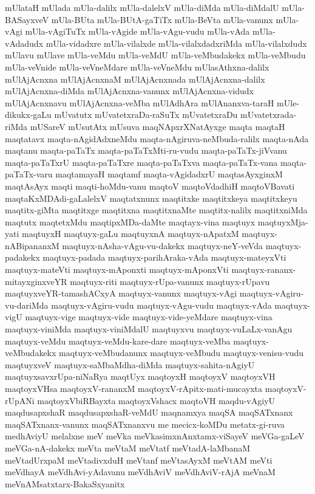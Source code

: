 {mUlataH
mUlada
mUla-dalilx
mUla-dalelxV
mUla-diMda
mUla-diMdalU
mUla-BASayxveV
mUla-BUta
mUla-BUtA-gaTiTx
mUla-BeVta
mUla-vanunx
mUla-vAgi
mUla-vAgiTuTx
mUla-vAgide
mUla-vAgu-vudu
mUla-vAda
mUla-vAdadudx
mUla-vidadxre
mUla-vilalxde
mUla-vilalxdadxriMda
mUla-vilalxdudx
mUlavu
mUlave
mUla-veMdu
mUla-veMdU
mUla-veMbudakekx
mUla-veMbudu
mUla-veVnide
mUla-veVneMdare
mUla-veVneMdu
mUlasAthxna-dalilx
mUlAjAcnxna
mUlAjAcnxnaM
mUlAjAcnxnada
mUlAjAcnxna-dalilx
mUlAjAcnxna-diMda
mUlAjAcnxna-vanunx
mUlAjAcnxna-vidudx
mUlAjAcnxnavu
mUlAjAcnxna-veMba
mUlAdhAra
mUlAnanxva-taraH
mUle-dikukx-gaLu
mUvatutx
mUvatetxraDa-raSuTx
mUvatetxraDu
mUvatetxrada-riMda
mUSareV
mUsutAtx
mUsuva
maqNApxrXNatAyxge
maqta
maqtaH
maqtatavx
maqta-nAgidAdxneMdu
maqta-nAgiruva-neMbuda-ralilx
maqta-nAda
maqtanu
maqta-paTaTx
maqta-paTaTxMti-ru-vudu
maqta-paTaTx-jiVvanu
maqta-paTaTxrU
maqta-paTaTxre
maqta-paTaTxva
maqta-paTaTx-vana
maqta-paTaTx-varu
maqtamayaH
maqtamf
maqta-vAgidadxrU
maqtasAyxginxM
maqtAsAyx
maqti
maqti-hoMdu-vanu
maqtoV
maqtoVdadhiH
maqtoVBavati
maqtaKxMDAdi-gaLalelxV
maqtatxnunx
maqtitxke
maqtitxkeya
maqtitxkeyu
maqtitx-giMta
maqtitxge
maqtitxna
maqtitxnaMte
maqtitx-nalilx
maqtitxniMda
maqtutx
maqtetxMdu
maqtipxMDa-daMte
maqtayx-vina
maqtuyx
maqtuyxMja-yati
maqtuyxH
maqtuyx-gaLu
maqtuyxnA
maqtuyx-nApatxM
maqtuyx-nABipananxM
maqtuyx-nAsha-vAgu-vu-dakekx
maqtuyx-neY-veVda
maqtuyx-padakekx
maqtuyx-padada
maqtuyx-parihAraka-vAda
maqtuyx-mateyxVti
maqtuyx-mateVti
maqtuyx-mAponxti
maqtuyx-mAponxVti
maqtuyx-rananx-mitayxginxveYR
maqtuyx-riti
maqtuyx-rUpa-vanunx
maqtuyx-rUpavu
maqtuyxveYR-tamashACxyA
maqtuyx-vanunx
maqtuyx-vAgi
maqtuyx-vAgiru-vu-dariMda
maqtuyx-vAgiru-vudu
maqtuyx-vAgu-vudu
maqtuyx-vAda
maqtuyx-vigU
maqtuyx-vige
maqtuyx-vide
maqtuyx-vide-yeMdare
maqtuyx-vina
maqtuyx-viniMda
maqtuyx-viniMdalU
maqtuyxvu
maqtuyx-vuLaLx-vanAgu
maqtuyx-veMdu
maqtuyx-veMdu-kare-dare
maqtuyx-veMba
maqtuyx-veMbudakekx
maqtuyx-veMbudanunx
maqtuyx-veMbudu
maqtuyx-venisu-vudu
maqtuyxveV
maqtuyx-saMbaMdha-diMda
maqtuyx-sahita-nAgiyU
maqtuyxsavxrUpa-niNaRya
maqtUyx
maqtoyxH
maqtoyxV
maqtoyxVH
maqtoyxVHsa
maqtoyxV-rananxM
maqtoyxV-rApitx-mati-mucayxta
maqtoyxV-rUpANi
maqtoyxVbiRBayxta
maqtoyxVshacx
maqtoVH
maqdu-vAgiyU
maqdusapxshaR
maqdusapxshaR-veMdU
maqnamxya
maqSA
maqSATxnanx
maqSATxnanx-vanunx
maqSATxnanxvu
me
mecicx-koMDu
metatx-gi-ruva
medhAviyU
melalxne
meV
meVka
meVkasimxnAnxtamx-viSayeV
meVGa-gaLeV
meVGa-nA-dakekx
meVta
meVtaM
meVtatf
meVtadA-laMbanaM
meVtadUrxpaM
meVtadivxduH
meVtanf
meVtasAyxM
meVtAM
meVti
meVdhayA
meVdhAvi-yAdavanu
meVdhAviV
meVdhAviV-rAjA
meVnaM
meVnAMsatxtarx-BakaSxyanitx
}

